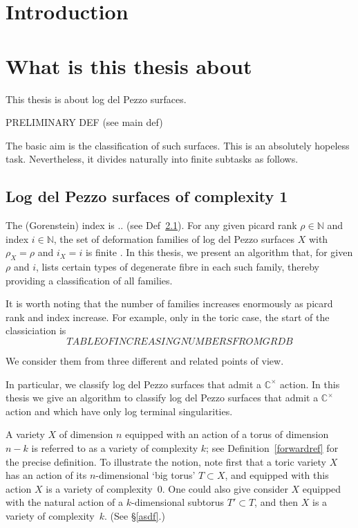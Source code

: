 \documentclass[11pt]{amsart}
\theoremstyle{definition}
\theoremstyle{definition}
\theoremstyle{definition}
\theoremstyle{definition}
\theoremstyle{definition}
\theoremstyle{definition}
\theoremstyle{definition}
\newcommand{\N}{\mathbb{N}}
\begin{document}
 


\section{Introduction}

\section{What is this thesis about}

This thesis is about log del Pezzo surfaces.

PRELIMINARY DEF (see main def)

The basic aim is the classification of such surfaces.
This is an absolutely hopeless task.
Nevertheless, it divides naturally into finite subtasks as follows.

\subsection{Log del Pezzo surfaces of complexity 1}
The (Gorenstein) index is .. (see Def~\ref{}).
For any given picard rank $\rho\in\N$ and index $i\in\N$, the set of deformation
families of log del Pezzo surfaces $X$ with $\rho_X=\rho$ and $i_X=i$
is finite \cite{}.
In this thesis, we present an algorithm that, for given $\rho$ and $i$,
lists certain types of degenerate fibre in each such family, thereby
providing a classification of all families.

It is worth noting that the number of families increases enormously as
picard rank and index increase. For example, only in the toric case, 
the start of the classiciation is
\[
TABLE OF INCREASING NUMBERS FROM GRDB
\]

We consider them from three different and related points of view.

In particular, we classify log del Pezzo surfaces that admit a $\mathbb{C}^\times$ action.
In this thesis we give an algorithm to classify log del Pezzo surfaces that admit a $\mathbb{C}^\times$ action and which have only log terminal singularities. 


A variety $X$ of dimension $n$ equipped with an action of a torus of dimension $n-k$ is referred to as a variety of complexity $k$; see Definition~\ref{forwardref} for the precise definition. To illustrate the notion, note first that a toric variety $X$ has an action of its $n$-dimensional `big torus' $T\subset X$, and equipped with this action $X$ is a variety of complexity~0.
One could also give consider $X$ equipped with the natural action of a $k$-dimensional
subtorus $T'\subset T$, and then $X$ is a variety of complexity~$k$. (See \S\ref{asdf}.)
\end{document}

